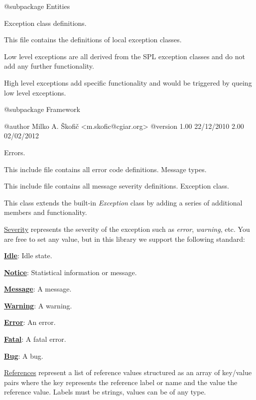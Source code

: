 \begin{DoxyVerb}    @subpackage     Entities\end{DoxyVerb}


Exception class definitions.

This file contains the definitions of local exception classes.

Low level exceptions are all derived from the S\-P\-L exception classes and do not add any further functionality.

High level exceptions add specific functionality and would be triggered by queing low level exceptions.

\begin{DoxyVerb}    @subpackage     Framework

    @author         Milko A. Škofič <m.skofic@cgiar.org>
    @version        1.00 22/12/2010
                            2.00 02/02/2012\end{DoxyVerb}


Errors.

This include file contains all error code definitions. Message types.

This include file contains all message severity definitions. Exception class.

This class extends the built-\/in {\itshape Exception} class by adding a series of additional members and functionality.

\hyperlink{}{Severity} represents the severity of the exception such as {\itshape error}, {\itshape warning}, etc. You are free to set any value, but in this library we support the following standard\-: 
\begin{DoxyItemize}
\item {\bfseries \hyperlink{}{Idle}}\-: Idle state. 
\item {\bfseries \hyperlink{}{Notice}}\-: Statistical information or message. 
\item {\bfseries \hyperlink{}{Message}}\-: A message. 
\item {\bfseries \hyperlink{}{Warning}}\-: A warning. 
\item {\bfseries \hyperlink{}{Error}}\-: An error. 
\item {\bfseries \hyperlink{}{Fatal}}\-: A fatal error. 
\item {\bfseries \hyperlink{}{Bug}}\-: A bug. 
\end{DoxyItemize}

\hyperlink{}{References} represent a list of reference values structured as an array of key/value pairs where the key represents the reference label or name and the value the reference value. Labels must be strings, values can be of any type.


